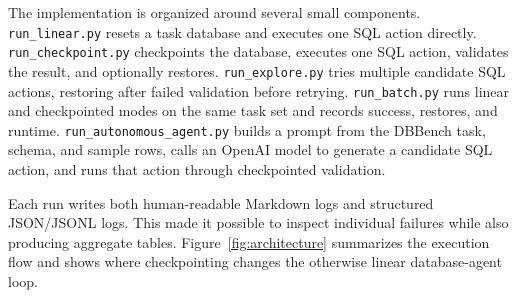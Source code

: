\documentclass[10pt,twocolumn]{article}
\begin{document}
The implementation is organized around several small components. \texttt{run\_linear.py} resets a task database and executes one SQL action directly. \texttt{run\_checkpoint.py} checkpoints the database, executes one SQL action, validates the result, and optionally restores. \texttt{run\_explore.py} tries multiple candidate SQL actions, restoring after failed validation before retrying. \texttt{run\_batch.py} runs linear and checkpointed modes on the same task set and records success, restores, and runtime. \texttt{run\_autonomous\_agent.py} builds a prompt from the DBBench task, schema, and sample rows, calls an OpenAI model to generate a candidate SQL action, and runs that action through checkpointed validation.

Each run writes both human-readable Markdown logs and structured JSON/JSONL logs. This made it possible to inspect individual failures while also producing aggregate tables. Figure~\ref{fig:architecture} summarizes the execution flow and shows where checkpointing changes the otherwise linear database-agent loop.
\end{document}
